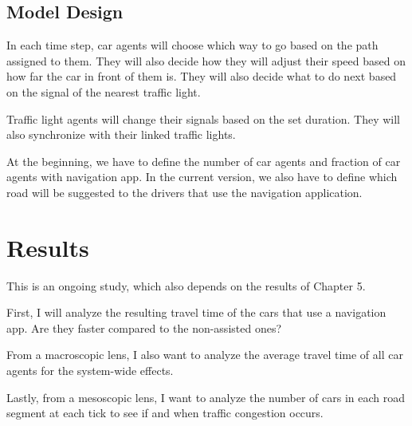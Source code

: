 \subsection{Model Design}
In each time step, car agents will choose which way to go based on the path assigned to them. They will also decide how they will adjust their speed based on how far the car in front of them is. They will also decide what to do next based on the signal of the nearest traffic light.

Traffic light agents will change their signals based on the set duration. They will also synchronize with their linked traffic lights.

At the beginning, we have to define the number of car agents and fraction of car agents with navigation app. In the current version, we also have to define which road will be suggested to the drivers that use the navigation application.

\section{Results}
This is an ongoing study, which also depends on the results of Chapter 5.

First, I will analyze the resulting travel time of the cars that use a navigation app. Are they faster compared to the non-assisted ones?

From a macroscopic lens, I also want to analyze the average travel time of all car agents for the system-wide effects.

Lastly, from a mesoscopic lens, I want to analyze the number of cars in each road segment at each tick to see if and when traffic congestion occurs.
